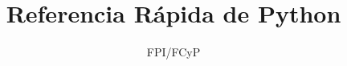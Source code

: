 \documentclass[10pt]{article}
\title{Referencia Rápida de Python}
\author{FPI/FCyP}
\begin{document}

\maketitle
\begin{multicols*}{3}



\end{multicols*}
\end{document}
